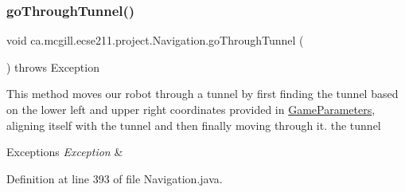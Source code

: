 \subsubsection{\texorpdfstring{go\+Through\+Tunnel()}{goThroughTunnel()}}
{\footnotesize\ttfamily void ca.\+mcgill.\+ecse211.\+project.\+Navigation.\+go\+Through\+Tunnel (\begin{DoxyParamCaption}{ }\end{DoxyParamCaption}) throws Exception}

This method moves our robot through a tunnel by first finding the tunnel based on the lower left and upper right coordinates provided in \hyperlink{enumca_1_1mcgill_1_1ecse211_1_1project_1_1_game_parameters}{Game\+Parameters}, aligning itself with the tunnel and then finally moving through it. the tunnel


\begin{DoxyExceptions}{Exceptions}
{\em Exception} & \\
\hline
\end{DoxyExceptions}


Definition at line 393 of file Navigation.\+java.


